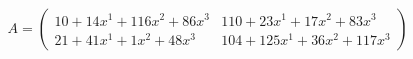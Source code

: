 \documentclass[preview]{standalone}
\begin{document}
\begin{align*}
A = \begin{pmatrix}10 + 14x^{1} + 116x^{2} + 86x^{3} & 110 + 23x^{1} + 17x^{2} + 83x^{3} \\ 21 + 41x^{1} + 1x^{2} + 48x^{3} & 104 + 125x^{1} + 36x^{2} + 117x^{3}\end{pmatrix}
\end{align*}
\end{document}
